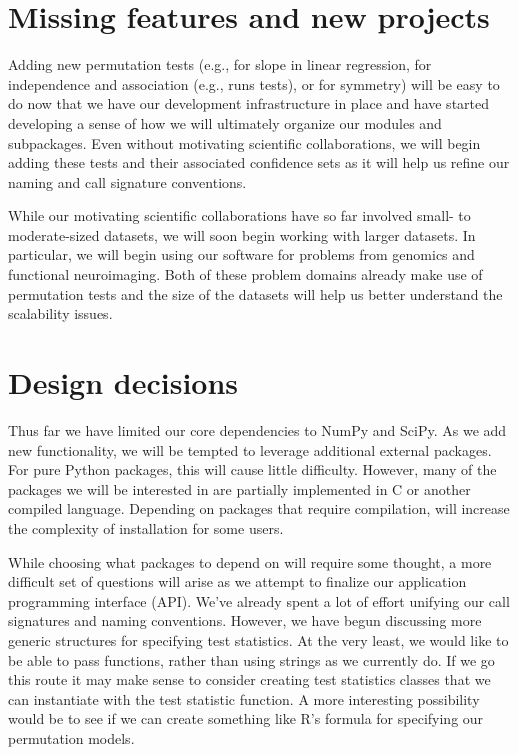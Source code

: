 \section{Missing features and new projects}


Adding new permutation tests (e.g., for slope in linear regression, for
independence and association (e.g., runs tests), or for symmetry) will be easy to
do now that we have our development infrastructure in place and have started
developing a sense of how we will ultimately organize our modules and
subpackages.  Even without motivating scientific collaborations, we will begin
adding these tests and their associated confidence sets as it will help us
refine our naming and call signature conventions.

While our motivating scientific collaborations have so far involved small- to
moderate-sized datasets, we will soon begin working with larger datasets.  In
particular, we will begin using our software for problems from
genomics and functional neuroimaging.  Both of these problem domains already
make use of permutation tests and the size of the datasets will help us
better understand the scalability issues.

\section{Design decisions}

Thus far we have limited our core dependencies to NumPy and SciPy.
As we add new functionality, we will be tempted to leverage additional
external packages.  For pure Python packages, this will cause little
difficulty.  However, many of the packages we will be interested in
are partially implemented in C or another compiled language.  Depending
on packages that require compilation, will increase the complexity
of installation for some users.

While choosing what packages to depend
on will require some thought, a more difficult set of questions will arise as
we attempt to finalize our application programming interface (API).  We've
already spent a lot of effort unifying our call signatures and naming
conventions.  However, we have begun discussing more generic structures for
specifying test statistics.  At the very least, we would like to be able to
pass functions, rather than using strings as we currently do.  If we go this
route it may make sense to consider creating test statistics classes that
we can instantiate with the test statistic function.  A more interesting
possibility would be to see if we can create something like R's formula
for specifying our permutation models.

